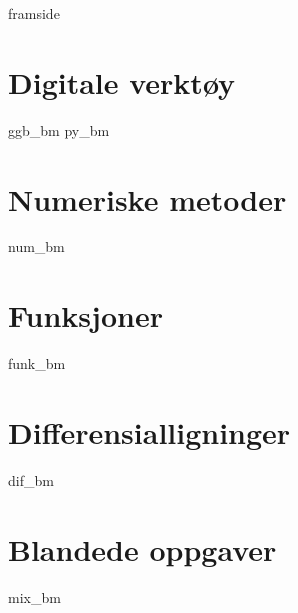 





\addto\captionsenglish{\renewcommand{\contentsname}{Innhold}}


	
	{framside}
	
	{\footnotesize \tableofcontents}
	\newpage
	
	\chapter{Digitale verktøy}
	\newpage
	{ggb_bm}
	{py_bm}
	
	\chapter{Numeriske metoder}
	\newpage
	{num_bm}
	
	\chapter{Funksjoner}
	\newpage
	{funk_bm}
	
	\chapter{Differensialligninger}
	\newpage
	{dif_bm}
	
	\chapter{Blandede oppgaver}
	\newpage
	{mix_bm}	
	\newpage
	
	
	
	
	


	
	



